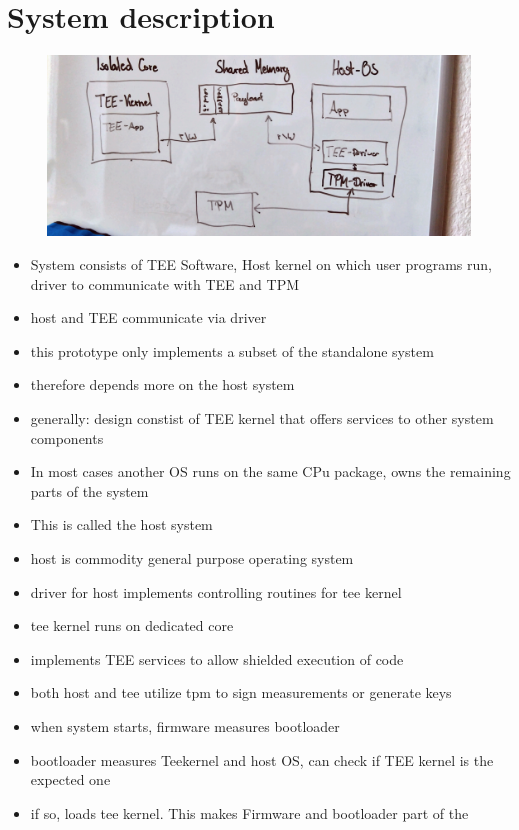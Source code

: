 \section{System description}
\begin{figure}
    \includegraphics[width=.8\textwidth]{images/architecture.JPG}
\end{figure}
\begin{itemize}
    \item System consists of TEE Software, Host kernel on which user programs run,
          driver to communicate with TEE and TPM
    \item host and TEE communicate via driver
    \item this prototype only implements a subset of the standalone system
    \item therefore depends more on the host system
    \item generally: design constist of TEE kernel that offers services to other
          system components
    \item In most cases another OS runs on the same CPu package, owns the remaining parts of the system
    \item This is called the host system
    \item host is commodity general purpose operating system
    \item driver for host implements controlling routines for tee kernel
    \item tee kernel runs on dedicated core
    \item implements TEE services to allow shielded execution of code
    \item both host and tee utilize tpm to sign measurements or generate keys
    \item when system starts, firmware measures bootloader
    \item bootloader measures Teekernel and host OS, can check if TEE kernel is
          the expected one
    \item if so, loads tee kernel. This makes Firmware and bootloader part of the

\end{itemize}
